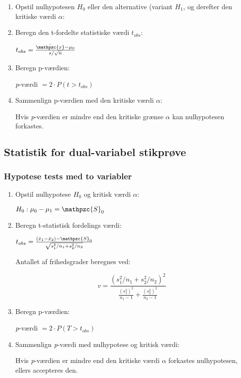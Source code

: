 \documentclass{article}
\newcommand{\mellemrum}{\vspace{2 ex}}
\newcommand{\cent}[1]{ \mellemrum \begin{center} #1\end{center} \mellemrum }
\newcommand{\script}[1]{\mathpzc{#1}}
\begin{document}
	\begin{enumerate}
		
		\item Opstil nulhypotesen $H_0$ eller den alternative (variant $H_1$, og derefter den kritiske værdi $\alpha$:
		\item Beregn den t-fordelte statistiske værdi $t_{obs}$:
		
		\cent{$ t_{obs} = \frac{\bar{\script{x}} - \mu_0}{s/\sqrt{n}} $}
		
		\item Beregn p-værdien:
		
		\cent{\textit{p}-værdi $ = 2 \cdot P(t > t_{obs}) $}
		\item Sammenlign p-værdien med den kritiske værdi $\alpha$:
		
		Hvis \textit{p}-værdien er mindre end den kritiske grænse $\alpha$ kan nulhypotesen forkastes.

	\end{enumerate}

	\subsection{Statistik for dual-variabel stikprøve}
	
	\subsubsection{Hypotese tests med to variabler}
	
	\begin{enumerate}
		\item Opstil nulhypotese $H_0$ og kritisk værdi $\alpha$:
		
		\cent{$ H_0 : \mu_0 - \mu_1 = \script{S}_0 $}
		
		\item Beregn t-statistisk fordelings værdi:
		
		\cent{$ t_{obs} = \frac{(\bar{x}_1 - \bar{x}_2) - \script{S}_0}{\sqrt{s_1^2/n_1 + s_2^2/n_2}} $}
		
		Antallet af frihedsgrader beregnes ved:
		
		\cent{$$ v = \frac{(s_1^2/n_1 + s_2^2/n_2)^2}{\frac{(s_1^2)^2}{n_1 - 1} + \frac{(s_2^2)^2}{n_2 - 1}} $$}
		
		\item Beregn p-værdien:
		
		\cent{\textit{p}-værdi  $ = 2 \cdot P(T > t_{obs})$}
		
		\item Sammenlign \textit{p}-værdi med nulhypotese og kritisk værdi:
		
		Hvis \textit{p}-værdien er mindre end den kritiske værdi $\alpha$ forkastes nulhypotesen, ellers accepteres den.
		
	\end{enumerate}
	
\end{document}

